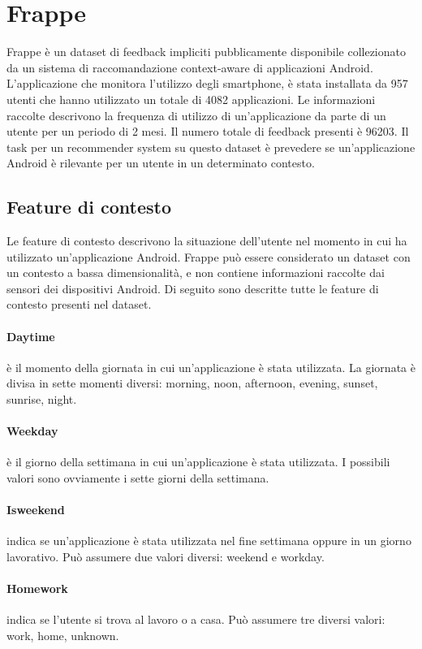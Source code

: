\documentclass[12pt,italian]{report}
\begin{document}
\section{Frappe}
Frappe \cite{frappe} è un dataset di feedback impliciti pubblicamente disponibile collezionato da un sistema di raccomandazione context-aware di applicazioni Android. L'applicazione che monitora l'utilizzo degli smartphone, è stata installata da 957 utenti che hanno utilizzato un totale di 4082 applicazioni. Le informazioni raccolte descrivono la frequenza di utilizzo di un'applicazione da parte di un utente per un periodo di 2 mesi. Il numero totale di feedback presenti è 96203. Il task per un recommender system su questo dataset è prevedere se un'applicazione Android è rilevante per un utente in un determinato contesto.

\subsection{Feature di contesto}
Le feature di contesto descrivono la situazione dell'utente nel momento in cui ha utilizzato un'applicazione Android. Frappe può essere considerato un dataset con un contesto a bassa dimensionalità, e non contiene informazioni raccolte dai sensori dei dispositivi Android. Di seguito sono descritte tutte le feature di contesto presenti nel dataset.

\paragraph{Daytime} è il momento della giornata in cui un'applicazione è stata utilizzata. La giornata è divisa in sette momenti diversi: morning, noon, afternoon, evening, sunset, sunrise, night.

\paragraph{Weekday} è il giorno della settimana in cui un'applicazione è stata utilizzata. I possibili valori sono ovviamente i sette giorni della settimana.

\paragraph{Isweekend} indica se un'applicazione è stata utilizzata nel fine settimana oppure in un giorno lavorativo. Può assumere due valori diversi: weekend e workday.

\paragraph{Homework} indica se l'utente si trova al lavoro o a casa. Può assumere tre diversi valori: work, home, unknown.
\end{document}
